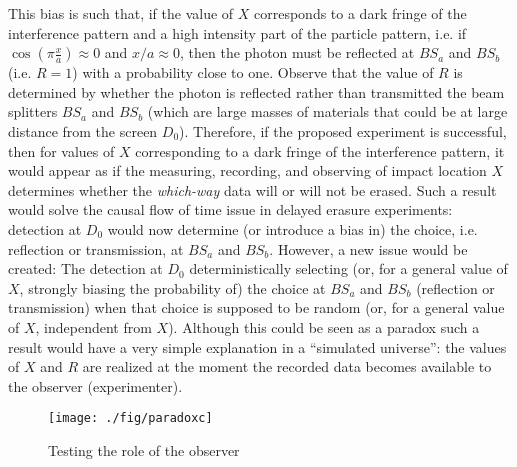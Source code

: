 \documentclass[11pt]{article}
\theoremstyle{definition}
\begin{document}
This bias is such that, if the value of $X$ corresponds to a dark fringe of the interference pattern and a high intensity part of the particle pattern, i.e. if $\cos(\pi \frac{x}{a}) \approx 0$ and $x/a\approx 0$, then the photon must be reflected at  $BS_a$ and $BS_b$ (i.e. $R=1$) with a probability close to one.
Observe that the value of $R$ is determined by whether the photon is reflected rather than  transmitted the beam splitters $BS_a$ and $BS_b$ (which are large masses of materials that could be at large distance from the  screen $D_0$).
Therefore, if the proposed experiment is successful, then for values of $X$ corresponding to a dark fringe of the interference pattern,
it would appear as if the measuring, recording, and observing of impact location $X$ determines whether the \emph{which-way} data will or will not be erased. Such a result would solve the causal flow of time issue in delayed erasure experiments: detection at $D_0$ would now determine (or introduce a bias in) the choice, i.e. reflection or  transmission, at $BS_a$ and $BS_b$.  However, a new issue would be created: The detection at $D_0$ deterministically selecting (or, for a general value of $X$, strongly biasing the probability of) the choice at $BS_a$ and $BS_b$ (reflection or transmission) when that choice is supposed to be random (or, for a general value of $X$, independent from $X$).   Although this could be seen as a paradox such a result would have a very simple explanation in a ``simulated universe'': the values of $X$ and $R$ are realized  at the moment the recorded data becomes available to the observer (experimenter).

 \begin{figure}[h!]
	\begin{center}
			\texttt{[image: ./fig/paradoxc]}
		\caption{Testing the role of the observer}\label{figparadox}
	\end{center}
\end{figure}
\end{document}
